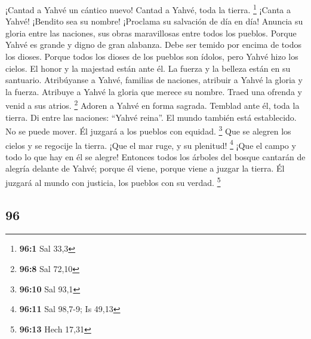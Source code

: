 \begin{paracol}{2}
 ¡Cantad a Yahvé un cántico nuevo! Cantad a Yahvé, toda la
tierra. \footnote{\textbf{96:1} Sal 33,3}  ¡Canta a Yahvé!
¡Bendito sea su nombre! ¡Proclama su salvación de día en día!
 Anuncia su gloria entre las naciones, sus obras
maravillosas entre todos los pueblos.  Porque Yahvé es
grande y digno de gran alabanza. Debe ser temido por encima de todos los
dioses.  Porque todos los dioses de los pueblos son
ídolos, pero Yahvé hizo los cielos.  El honor y la
majestad están ante él. La fuerza y la belleza están en su santuario.
 Atribúyanse a Yahvé, familias de naciones, atribuir a
Yahvé la gloria y la fuerza.  Atribuye a Yahvé la gloria
que merece su nombre. Traed una ofrenda y venid a sus atrios.
\footnote{\textbf{96:8} Sal 72,10}  Adoren a Yahvé en
forma sagrada. Temblad ante él, toda la tierra.  Di entre
las naciones: ``Yahvé reina''. El mundo también está establecido. No se
puede mover. Él juzgará a los pueblos con equidad. \footnote{\textbf{96:10}
  Sal 93,1}  Que se alegren los cielos y se regocije la
tierra. ¡Que el mar ruge, y su plenitud! \footnote{\textbf{96:11} Sal
  98,7-9; Is 49,13}  ¡Que el campo y todo lo que hay en
él se alegre! Entonces todos los árboles del bosque cantarán de alegría
 delante de Yahvé; porque él viene, porque viene a juzgar
la tierra. Él juzgará al mundo con justicia, los pueblos con su verdad.
\footnote{\textbf{96:13} Hech 17,31}

\switchcolumn
\begin{otherlanguage}{english}

\hypertarget{section-191}{%
\section{96}\label{section-191}}


\end{otherlanguage}
\end{paracol}
